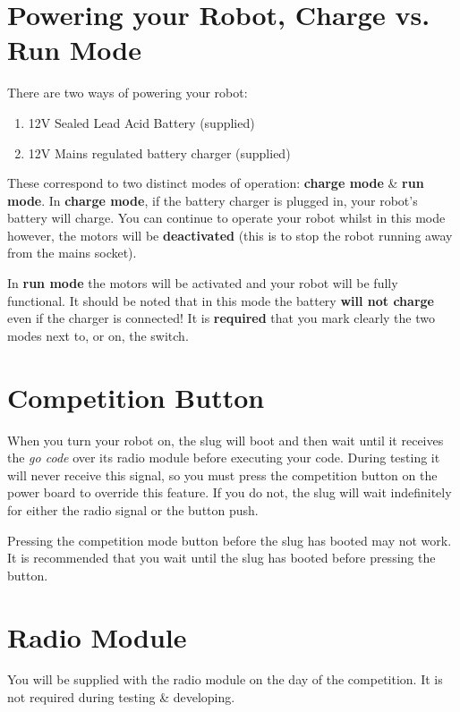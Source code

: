 \documentclass[a4paper, 12pt]{article}
\begin{document}
\section{Powering your Robot, Charge vs. Run Mode}
There are two ways of powering your robot:
\begin{enumerate}
\item 12V Sealed Lead Acid Battery (supplied)
\item 12V Mains regulated battery charger (supplied)
\end{enumerate}

These correspond to two distinct modes of operation: \textbf{charge mode} \& \textbf{run mode}. In \textbf{charge mode}, if the battery charger is plugged in, your robot's battery will charge. You can continue to operate your robot whilst in this mode however, the motors will be \textbf{deactivated} (this is to stop the robot running away from the mains socket). 

\vspace{12pt}
In \textbf{run mode} the motors will be activated and your robot will be fully functional. It should be noted that in this mode the battery \textbf{will not charge} even if the charger is connected! It is \textbf{required} that you mark clearly the two modes next to, or on, the switch.

\section{Competition Button}
When you turn your robot on, the slug will boot and then wait until it receives the \textit{go code} over its radio module before executing your code. During testing it will never receive this signal, so you must press the competition button on the power board to override this feature. If you do not, the slug will wait indefinitely for either the radio signal or the button push. 

\vspace{12pt}

Pressing the competition mode button before the slug has booted may not work. It is recommended that you wait until the slug has booted before pressing the button. 

\section{Radio Module}
You will be supplied with the radio module on the day of the competition. It is not required during testing \& developing.
\end{document}
